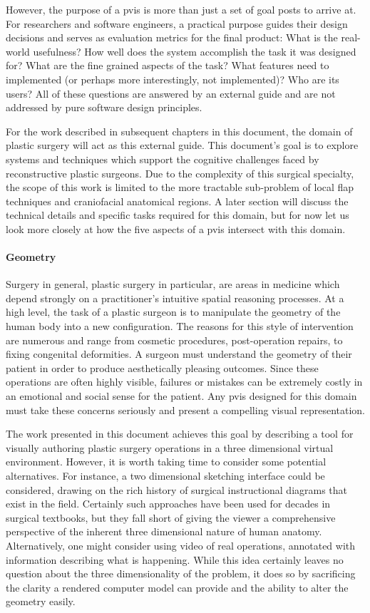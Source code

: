 \documentclass[12pt,oneside,letterpaper]{memoir}
\begin{document}
However, the purpose of a \gls{pvis} is more than just a set of goal
posts to arrive at. For researchers and software engineers, a
practical purpose guides their design decisions and serves as
evaluation metrics for the final product: What is the real-world
usefulness? How well does the system accomplish the task it was designed for?
What are the fine grained aspects of the task? What features need to
implemented (or perhaps more interestingly, not implemented)? Who are
its users? All of these questions are answered by an external guide
and are not addressed by pure software design principles.

For the work described in subsequent chapters in this document, the
domain of plastic surgery will act as this external
guide. This document's goal is to explore systems and techniques which
support the cognitive challenges faced by reconstructive plastic
surgeons. Due to the complexity of this surgical specialty, the scope
of this work is limited to the more tractable sub-problem of local flap
techniques and craniofacial anatomical regions. A later section will
discuss the technical details and specific tasks required for this
domain, but for now let us look more closely at how the five aspects
of a \gls{pvis} intersect with this domain.

\paragraph{Geometry} Surgery in general, plastic surgery in
particular, are areas in medicine which depend strongly on a
practitioner's intuitive spatial reasoning processes. At a high level,
the task of a plastic surgeon is to manipulate the geometry of the
human body into a new configuration. The reasons for this style of
intervention are numerous and range from cosmetic procedures,
post-operation repairs, to fixing congenital
deformities. A surgeon must understand the geometry of their patient
in order to produce aesthetically pleasing outcomes. Since these
operations are often highly visible, failures or mistakes can be
extremely costly in an emotional and social sense for the patient. Any
\gls{pvis} designed for this domain must take these concerns seriously
and present a compelling visual representation.

The work presented in this document achieves this goal by describing a
tool for visually authoring plastic surgery operations in a three
dimensional virtual environment. However, it is worth taking time to consider
some potential alternatives. For instance, a two dimensional sketching
interface could be considered, drawing on the rich history of surgical
instructional diagrams that exist in the field. Certainly such
approaches have been used for decades in surgical textbooks, but they
fall short of giving the viewer a comprehensive perspective of the
inherent three dimensional nature of human anatomy. Alternatively, one
might consider using video of real operations, annotated with
information describing what is happening. While this idea certainly
leaves no question about the three dimensionality of the problem, it
does so by sacrificing the clarity a rendered computer model can
provide and the ability to alter the geometry easily.
\end{document}
